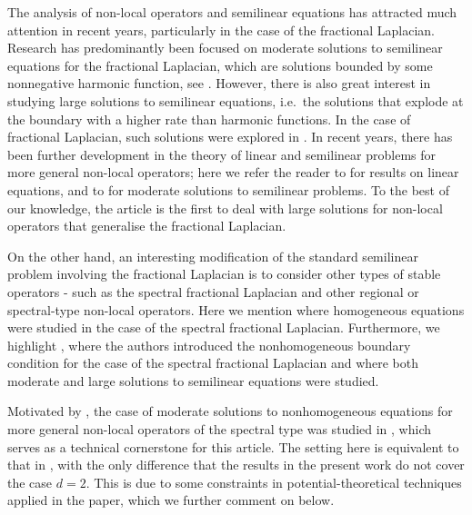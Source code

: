 \documentclass[12pt,a4paper,onecolumn]{amsart}
\theoremstyle{definition}
\newcommand{\1}{\mathbf 1}
\numberwithin{equation}{section}
\begin{document}
The analysis of non-local operators and semilinear equations has attracted much attention in recent years, particularly in the case of the fractional Laplacian. Research has predominantly been focused on moderate solutions to semilinear equations for the fractional Laplacian, which are solutions bounded by some nonnegative harmonic function, see \cite{Aba15a,BC17,BCBF16, BCBF18,bogdan_et_al_19,CFQ,FQ12, FQT12}. However, there is also great interest in studying large solutions to semilinear equations, i.e.~the solutions that explode at the boundary with a higher rate than harmonic functions. In the case of fractional Laplacian, such solutions were explored in \cite{Aba17, BCBF16, CFQ}. In recent years, there has been further development in the theory of linear and semilinear problems for more general non-local operators{;} here we refer the reader to \cite{bogdan_extension,BL-na21,BMS23,FJ23,remarks_on_nonlocal,KKLL} for results on linear equations, and to \cite{semilinear_bvw,BJ20,CGCV,HuynhNguyen2022_new,klimsiak2023dirichlet} for moderate solutions to semilinear problems. To the best of our knowledge, the article \cite{semilinear_cvw} is the first to deal with large solutions for non-local operators that generalise the fractional Laplacian.


On the other hand, an interesting modification of the standard semilinear problem involving the fractional Laplacian is to consider other types of stable operators - such as the spectral fractional Laplacian and other regional or spectral-type non-local operators. Here we mention \cite{dhifli2012,grubb2016,SV2014} where homogeneous equations were studied in the case of the spectral fractional Laplacian. Furthermore, we highlight \cite{AbaDupaNonhomo2017}, where the authors introduced the nonhomogeneous boundary condition for the case of the spectral fractional Laplacian and where both moderate and large solutions to semilinear equations were studied.

Motivated by \cite{AbaDupaNonhomo2017}, the case of moderate solutions to nonhomogeneous equations for more general non-local operators of the spectral type was studied in \cite{Bio23}, which serves as a technical cornerstone for this article. The setting here is equivalent to that in \cite{Bio23}, with the only difference that the results in the present work do not cover the case $d=2$. This is due to some constraints in potential-theoretical techniques applied in the paper, which we further comment on below.
\end{document}
